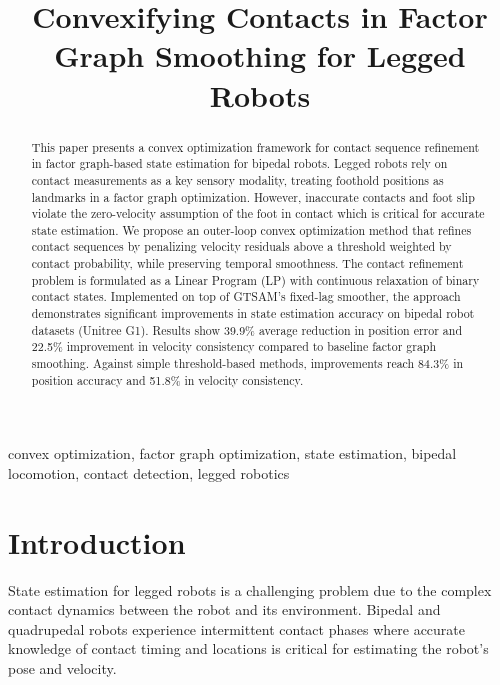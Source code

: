 \documentclass[conference]{IEEEtran}
\begin{document}
\pagestyle{plain}

\title{Convexifying Contacts in Factor Graph Smoothing for Legged Robots}

\author{
}

\maketitle

\begin{abstract}
This paper presents a convex optimization framework for contact sequence refinement in factor graph-based state 
estimation for bipedal robots. Legged robots rely on contact measurements as a key sensory modality, treating foothold 
positions as landmarks in a factor graph optimization. However, inaccurate contacts and foot slip violate the zero-velocity
 assumption of the foot in contact which is critical for accurate state estimation. We propose an outer-loop convex optimization
 method that refines contact sequences by penalizing velocity residuals above a threshold weighted by contact probability,
  while preserving temporal smoothness. The contact refinement problem is formulated as a Linear Program (LP)
   with continuous relaxation of binary contact states. Implemented on top of GTSAM's fixed-lag smoother, the approach 
    demonstrates significant improvements in state estimation accuracy on bipedal robot datasets (Unitree G1). 
    Results show 39.9\% average reduction in position error and 22.5\% improvement in velocity consistency compared to 
    baseline factor graph smoothing. Against simple threshold-based methods, improvements reach 84.3\% in position 
    accuracy and 51.8\% in velocity consistency.
\end{abstract}

\begin{IEEEkeywords}
convex optimization, factor graph optimization, state estimation, bipedal locomotion, contact detection, legged robotics
\end{IEEEkeywords}

\section{Introduction}
State estimation for legged robots is a challenging problem due to the complex
 contact dynamics between the robot and its environment. Bipedal and quadrupedal
  robots experience intermittent contact phases where accurate knowledge of contact
   timing and locations is critical for estimating the robot's pose and velocity.
\end{document}
